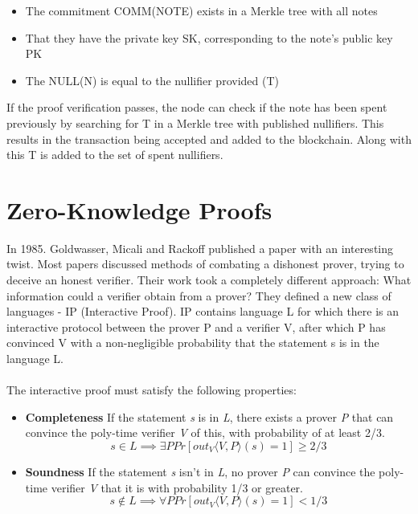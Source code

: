 \begin{itemize}
    \item The commitment COMM(NOTE) exists in a Merkle tree with all notes
    \item That they have the private key SK, corresponding to the note's public key PK
    \item The NULL(N) is equal to the nullifier provided (T)
\end{itemize}

If the proof verification passes, the node can check if the note has been spent previously by searching for T in a Merkle tree with published nullifiers. This results in the transaction being accepted and added to the blockchain. Along with this T is added to the set of spent nullifiers.


\section{Zero-Knowledge Proofs}

In 1985. Goldwasser, Micali and Rackoff published a paper with an interesting twist. Most papers discussed methods of combating a dishonest prover, trying to deceive an honest verifier. Their work took a completely different approach: What information could a verifier obtain from a prover? They defined a new class of languages - IP (Interactive Proof). IP contains language L for which there is an interactive protocol between the prover P and a verifier V, after which P has convinced V with a non-negligible probability that the statement s is in the language L.\\
\\
The interactive proof must satisfy the following properties:
\begin{itemize}
    \item \textbf{Completeness} If the statement \textit{s} is in \textit{L}, there exists a prover \textit{P} that can convince the poly-time verifier \textit{V} of this, with probability of at least 2/3.
    $$ s \in L \implies \exists P Pr[out_V \langle V, P \rangle (s) = 1 ] \geq 2/3 $$
    \item \textbf{Soundness} If the statement \textit{s} isn't in \textit{L}, no prover \textit{P} can convince the poly-time verifier \textit{V} that it is with probability 1/3 or greater.
    $$ s \notin L \implies \forall P Pr[out_V \langle V, P \rangle (s) = 1 ] < 1/3 $$
\end{itemize}

